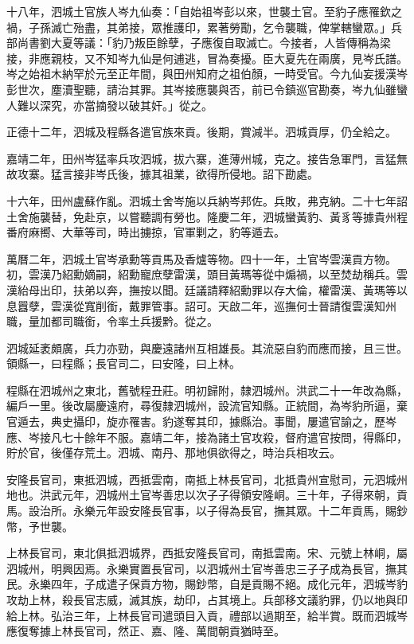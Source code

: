 \begin{pinyinscope}
十八年，泗城土官族人岑九仙奏：「自始祖岑彭以來，世襲土官。至豹子應罹欽之禍，子孫滅亡殆盡，其弟接，眾推護印，累著勞勩，乞令襲職，俾掌轄蠻眾。」兵部尚書劉大夏等議：「豹乃叛臣餘孽，子應復自取滅亡。今接者，人皆傳稱為梁接，非應親枝，又不知岑九仙是何逋逃，冒為奏擾。臣大夏先在兩廣，見岑氏譜。岑之始祖木納罕於元至正年間，與田州知府之祖伯顏，一時受官。今九仙妄援漢岑彭世次，塵瀆聖聽，請治其罪。其岑接應襲與否，前已令鎮巡官勘奏，岑九仙雖蠻人難以深究，亦當摘發以破其奸。」從之。

正德十二年，泗城及程縣各遣官族來貢。後期，賞減半。泗城貢厚，仍全給之。

嘉靖二年，田州岑猛率兵攻泗城，拔六寨，進薄州城，克之。接告急軍門，言猛無故攻寨。猛言接非岑氏後，據其祖業，欲得所侵地。詔下勘處。

十六年，田州盧蘇作亂。泗城土舍岑施以兵納岑邦佐。兵敗，弗克納。二十七年詔土舍施襲替，免赴京，以嘗聽調有勞也。隆慶二年，泗城蠻黃豹、黃豸等據貴州程番府麻嚮、大華等司，時出擄掠，官軍剿之，豹等遁去。

萬曆二年，泗城土官岑承勳等貢馬及香爐等物。四十一年，土官岑雲漢貢方物。初，雲漢乃紹勳嫡嗣，紹勳寵庶孽雷漢，頭目黃瑪等從中煽禍，以至焚劫稱兵。雲漢紿母出印，扶弟以奔，撫按以聞。廷議請釋紹勳罪以存大倫，權雷漢、黃瑪等以息囂孽，雲漢從寬削銜，戴罪管事。詔可。天啟二年，巡撫何士晉請復雲漢知州職，量加都司職銜，令率土兵援黔。從之。

泗城延袤頗廣，兵力亦勁，與慶遠諸州互相雄長。其流惡自豹而應而接，且三世。領縣一，曰程縣；長官司二，曰安隆，曰上林。

程縣在泗城州之東北，舊號程丑莊。明初歸附，隸泗城州。洪武二十一年改為縣，編戶一里。後改屬慶遠府，尋復隸泗城州，設流官知縣。正統間，為岑豹所逼，棄官遁去，典史攝印，旋亦罹害。豹遂奪其印，據縣治。事聞，屢遣官諭之，歷岑應、岑接凡七十餘年不服。嘉靖二年，接為諸土官攻殺，督府遣官按問，得縣印，貯於官，後僅存荒土。泗城、南丹、那地俱欲得之，時治兵相攻云。

安隆長官司，東抵泗城，西抵雲南，南抵上林長官司，北抵貴州宣慰司，元泗城州地也。洪武元年，泗城州土官岑善忠以次子子得領安隆峒。三十年，子得來朝，貢馬。設治所。永樂元年設安隆長官事，以子得為長官，撫其眾。十二年貢馬，賜鈔幣，予世襲。

上林長官司，東北俱抵泗城界，西抵安隆長官司，南抵雲南。宋、元號上林峒，屬泗城州，明興因焉。永樂實置長官司，以泗城州土官岑善忠三子子成為長官，撫其民。永樂四年，子成遣子保貢方物，賜鈔幣，自是貢賜不絕。成化元年，泗城岑豹攻劫上林，殺長官志威，滅其族，劫印，占其境上。兵部移文議豹罪，仍以地與印給上林。弘治三年，上林長官司遣頭目入貢，禮部以過期至，給半賞。既而泗城岑應復奪據上林長官司，然正、嘉、隆、萬間朝貢猶時至。


\end{pinyinscope}
